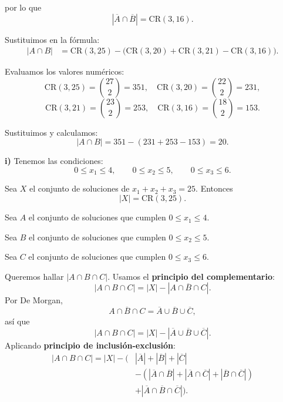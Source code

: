 \documentclass[a4paper,12pt]{article}
\begin{document}
\begin{ejercicio}[title=Ejercicio 31]
por lo que
\[
|\overline{A}\cap\overline{B}| = \mathrm{CR}(3,16).
\]

Sustituimos en la fórmula:
\[
\begin{aligned}
|A\cap B|
&= \mathrm{CR}(3,25) - \big(\mathrm{CR}(3,20) + \mathrm{CR}(3,21) - \mathrm{CR}(3,16)\big).
\end{aligned}
\]

Evaluamos los valores numéricos:
\[
\mathrm{CR}(3,25)=\binom{27}{2}=351,\quad
\mathrm{CR}(3,20)=\binom{22}{2}=231,
\]
\[
\mathrm{CR}(3,21)=\binom{23}{2}=253,\quad
\mathrm{CR}(3,16)=\binom{18}{2}=153.
\]

Sustituimos y calculamos:
\[
|A\cap B| = 351 - (231 + 253 - 153) = \boxed{20}.
\]

\textbf{i)} Tenemos las condiciones:
\[
0 \le x_1 \le 4,\qquad 0 \le x_2 \le 5,\qquad 0 \le x_3 \le 6.
\]

Sea \(X\) el conjunto de soluciones de \(x_1+x_2+x_3=25\).
Entonces
\[
|X| = \mathrm{CR}(3,25).
\]

Sea \(A\) el conjunto de soluciones que cumplen \(0\le x_1\le 4\).

Sea \(B\) el conjunto de soluciones que cumplen \(0\le x_2\le 5\).

Sea \(C\) el conjunto de soluciones que cumplen \(0\le x_3\le 6\).

\vspace{0.5em}

Queremos hallar \(|A\cap B \cap C|\). Usamos el \textbf{principio del complementario}:
\[
|A\cap B \cap C| = |X| - |\overline{A\cap B \cap C}|.
\]
Por De Morgan,
\[
\overline{A\cap B \cap C}=\overline{A}\cup\overline{B}\cup\overline{C},
\]
así que
\[
|A\cap B \cap C| = |X| - |\overline{A}\cup\overline{B}\cup\overline{C}|.
\]
Aplicando \textbf{principio de inclusión-exclusión}:
\[
\begin{aligned}
|A\cap B \cap C| = |X| - \Big(&|\overline{A}| + |\overline{B}| + |\overline{C}| \\
&- (|\overline{A}\cap\overline{B}| + |\overline{A}\cap\overline{C}| + |\overline{B}\cap\overline{C}|) \\
&+ |\overline{A}\cap\overline{B}\cap\overline{C}|\Big).
\end{aligned}
\]

\end{ejercicio}
\end{document}
